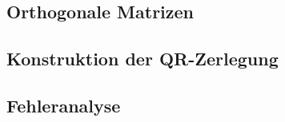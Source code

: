 \subsection{Orthogonale Matrizen}

\subsection{Konstruktion der QR-Zerlegung}

\subsection{Fehleranalyse}



